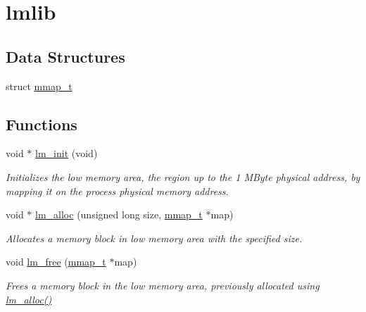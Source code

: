 \hypertarget{group__lmlib}{}\section{lmlib}
\label{group__lmlib}
\subsection*{Data Structures}
\begin{DoxyCompactItemize}
\item 
struct \hyperlink{structmmap__t}{mmap\+\_\+t}
\end{DoxyCompactItemize}
\subsection*{Functions}
\begin{DoxyCompactItemize}
\item 
void $\ast$ \hyperlink{group__lmlib_ga00a9c17c01e794a6bfc80fc5c6ab1ed1}{lm\+\_\+init} (void)
\begin{DoxyCompactList}\small\item\em Initializes the low memory area, the region up to the 1 M\+Byte physical address, by mapping it on the process\textquotesingle{} physical memory address. \end{DoxyCompactList}\item 
void $\ast$ \hyperlink{group__lmlib_gae45d971ce2ffcf4dc2677eba033a92cd}{lm\+\_\+alloc} (unsigned long size, \hyperlink{structmmap__t}{mmap\+\_\+t} $\ast$map)
\begin{DoxyCompactList}\small\item\em Allocates a memory block in low memory area with the specified size. \end{DoxyCompactList}\item 
void \hyperlink{group__lmlib_ga73e89d9c297b7390021fb545513579c6}{lm\+\_\+free} (\hyperlink{structmmap__t}{mmap\+\_\+t} $\ast$map)
\begin{DoxyCompactList}\small\item\em Frees a memory block in the low memory area, previously allocated using \hyperlink{group__lmlib_gae45d971ce2ffcf4dc2677eba033a92cd}{lm\+\_\+alloc()} \end{DoxyCompactList}\end{DoxyCompactItemize}
